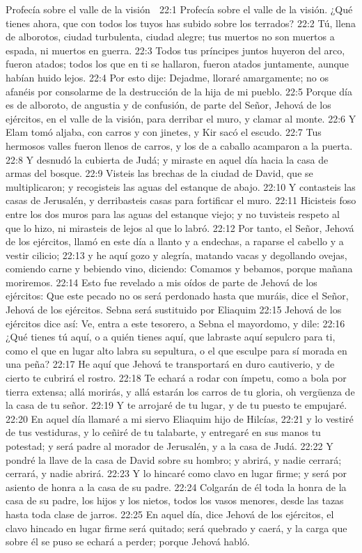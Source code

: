 Profecía sobre el valle de la visión  

22:1 Profecía sobre el valle de la visión. ¿Qué tienes ahora, que con todos los tuyos has subido sobre los terrados?  
22:2 Tú, llena de alborotos, ciudad turbulenta, ciudad alegre; tus muertos no son muertos a espada, ni muertos en guerra.  
22:3 Todos tus príncipes juntos huyeron del arco, fueron atados; todos los que en ti se hallaron, fueron atados juntamente, aunque habían huido lejos.  
22:4 Por esto dije: Dejadme, lloraré amargamente; no os afanéis por consolarme de la destrucción de la hija de mi pueblo.  
22:5 Porque día es de alboroto, de angustia y de confusión, de parte del Señor, Jehová de los ejércitos, en el valle de la visión, para derribar el muro, y clamar al monte.  
22:6 Y Elam tomó aljaba, con carros y con jinetes, y Kir sacó el escudo.  
22:7 Tus hermosos valles fueron llenos de carros, y los de a caballo acamparon a la puerta.  
22:8 Y desnudó la cubierta de Judá; y miraste en aquel día hacia la casa de armas del bosque.  
22:9 Visteis las brechas de la ciudad de David, que se multiplicaron; y recogisteis las aguas del estanque de abajo. 
22:10 Y contasteis las casas de Jerusalén, y derribasteis casas para fortificar el muro.  
22:11 Hicisteis foso entre los dos muros para las aguas del estanque viejo; y no tuvisteis respeto al que lo hizo, ni mirasteis de lejos al que lo labró.  
22:12 Por tanto, el Señor, Jehová de los ejércitos, llamó en este día a llanto y a endechas, a raparse el cabello y a vestir cilicio;  
22:13 y he aquí gozo y alegría, matando vacas y degollando ovejas, comiendo carne y bebiendo vino, diciendo: Comamos y bebamos, porque mañana moriremos. 
22:14 Esto fue revelado a mis oídos de parte de Jehová de los ejércitos: Que este pecado no os será perdonado hasta que muráis, dice el Señor, Jehová de los ejércitos.  
Sebna será sustituido por Eliaquim  
22:15 Jehová de los ejércitos dice así: Ve, entra a este tesorero, a Sebna el mayordomo, y dile:  
22:16 ¿Qué tienes tú aquí, o a quién tienes aquí, que labraste aquí sepulcro para ti, como el que en lugar alto labra su sepultura, o el que esculpe para sí morada en una peña?  
22:17 He aquí que Jehová te transportará en duro cautiverio, y de cierto te cubrirá el rostro.  
22:18 Te echará a rodar con ímpetu, como a bola por tierra extensa; allá morirás, y allá estarán los carros de tu gloria, oh vergüenza de la casa de tu señor.  
22:19 Y te arrojaré de tu lugar, y de tu puesto te empujaré.  
22:20 En aquel día llamaré a mi siervo Eliaquim hijo de Hilcías,  
22:21 y lo vestiré de tus vestiduras, y lo ceñiré de tu talabarte, y entregaré en sus manos tu potestad; y será padre al morador de Jerusalén, y a la casa de Judá.  
22:22 Y pondré la llave de la casa de David sobre su hombro; y abrirá, y nadie cerrará; cerrará, y nadie abrirá. 
22:23 Y lo hincaré como clavo en lugar firme; y será por asiento de honra a la casa de su padre.  
22:24 Colgarán de él toda la honra de la casa de su padre, los hijos y los nietos, todos los vasos menores, desde las tazas hasta toda clase de jarros.  
22:25 En aquel día, dice Jehová de los ejércitos, el clavo hincado en lugar firme será quitado; será quebrado y caerá, y la carga que sobre él se puso se echará a perder; porque Jehová habló. 

